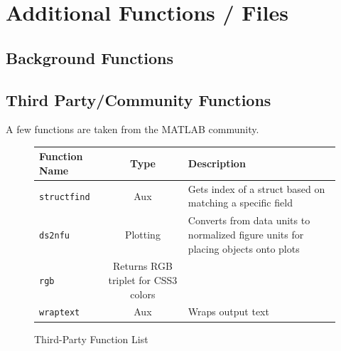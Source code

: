 \documentclass{article}
\begin{document}
\section{Additional Functions / Files} %
\subsection{Background Functions}

\subsection{Third Party/Community Functions}
A few functions are taken from the MATLAB community. 

\begin{figure}[h]
\caption{Third-Party Function List}
\begin{center}
\begin{tabular}{l c | p{3.5in}}
Function Name&Type&Description\\ \hline
\texttt{structfind}&Aux&Gets index of a struct based on matching a specific field\\
\texttt{ds2nfu}&Plotting&Converts from data units to normalized figure units for placing objects onto plots\\
\texttt{rgb}&Returns RGB triplet for CSS3 colors\\
\texttt{wraptext}&Aux&Wraps output text\\ 
\end{tabular}
\end{center}
\end{figure}
\end{document}
